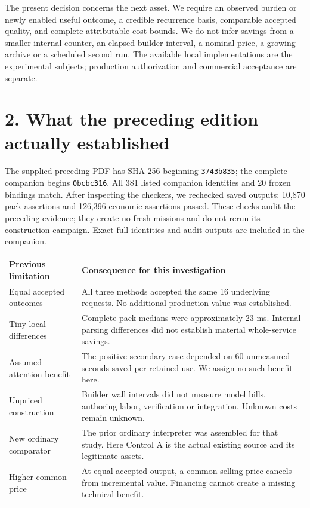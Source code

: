 \documentclass[11pt,letterpaper]{article}
\newcommand{\code}[1]{{\small\nolinkurl{#1}}}
\newcommand{\sect}[1]{\section*{#1}}
\begin{document}
The present decision concerns the next asset. We require an observed burden or newly enabled useful outcome, a credible recurrence basis, comparable accepted quality, and complete attributable cost bounds. We do not infer savings from a smaller internal counter, an elapsed builder interval, a nominal price, a growing archive or a scheduled second run. The available local implementations are the experimental subjects; production authorization and commercial acceptance are separate.

\clearpage
\sect{2. What the preceding edition actually established}
The supplied preceding PDF has SHA-256 beginning \code{3743b835}; the complete companion begins \code{0bcbc316}. All 381 listed companion identities and 20 frozen bindings match. After inspecting the checkers, we rechecked saved outputs: 10,870 pack assertions and 126,396 economic assertions passed. These checks audit the preceding evidence; they create no fresh missions and do not rerun its construction campaign. Exact full identities and audit outputs are included in the companion.\cite{prior}

\begin{tabularx}{\linewidth}{@{}p{.30\linewidth}Y@{}}
\toprule
\textbf{Previous limitation} & \textbf{Consequence for this investigation}\\
\midrule
Equal accepted outcomes & All three methods accepted the same 16 underlying requests. No additional production value was established.\\
Tiny local differences & Complete pack medians were approximately 23 ms. Internal parsing differences did not establish material whole-service savings.\\
Assumed attention benefit & The positive secondary case depended on 60 unmeasured seconds saved per retained use. We assign no such benefit here.\\
Unpriced construction & Builder wall intervals did not measure model bills, authoring labor, verification or integration. Unknown costs remain unknown.\\
New ordinary comparator & The prior ordinary interpreter was assembled for that study. Here Control A is the actual existing source and its legitimate assets.\\
Higher common price & At equal accepted output, a common selling price cancels from incremental value. Financing cannot create a missing technical benefit.\\
\bottomrule
\end{tabularx}
\end{document}
